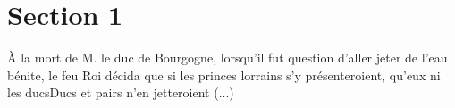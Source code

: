 \documentclass{article}
\begin{document}
\section{Section 1}



\`A la mort de M. le \gls{duc} de Bourgogne, lorsqu'il fut question d'aller jeter de l'eau b\'enite, le feu Roi d\'ecida que si les princes lorrains s'y pr\'esenteroient, qu'eux ni les \gls{ducs}Ducs et pairs n'en jetteroient (...)





\printglossaries
\end{document}
